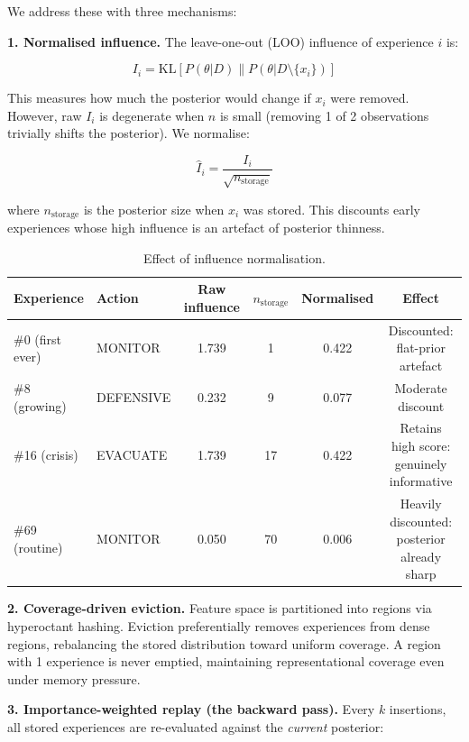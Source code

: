 \documentclass[11pt]{article}
\begin{document}
We address these with three mechanisms:

\textbf{1. Normalised influence.} The leave-one-out (LOO) influence of experience $i$ is:

\begin{equation}
I_i = \mathrm{KL}[P(\theta | D) \| P(\theta | D \setminus \{x_i\})]
\end{equation}

This measures how much the posterior would change if $x_i$ were removed. However, raw $I_i$ is degenerate when $n$ is small (removing 1 of 2 observations trivially shifts the posterior). We normalise:

\begin{equation}
\hat{I}_i = \frac{I_i}{\sqrt{n_{\text{storage}}}}
\end{equation}

\noindent where $n_{\text{storage}}$ is the posterior size when $x_i$ was stored. This discounts early experiences whose high influence is an artefact of posterior thinness.

\begin{table}[h]
\centering
\caption{Effect of influence normalisation.}
\label{tab:influence}
\small
\begin{tabular}{llcccc}
\toprule
\textbf{Experience} & \textbf{Action} & \textbf{Raw influence} & $n_{\text{storage}}$ & \textbf{Normalised} & \textbf{Effect} \\
\midrule
\#0 (first ever) & MONITOR & 1.739 & 1 & 0.422 & Discounted: flat-prior artefact \\
\#8 (growing) & DEFENSIVE & 0.232 & 9 & 0.077 & Moderate discount \\
\#16 (crisis) & EVACUATE & 1.739 & 17 & 0.422 & Retains high score: genuinely informative \\
\#69 (routine) & MONITOR & 0.050 & 70 & 0.006 & Heavily discounted: posterior already sharp \\
\bottomrule
\end{tabular}
\end{table}

\textbf{2. Coverage-driven eviction.} Feature space is partitioned into regions via hyperoctant hashing. Eviction preferentially removes experiences from dense regions, rebalancing the stored distribution toward uniform coverage. A region with 1 experience is never emptied, maintaining representational coverage even under memory pressure.

\textbf{3. Importance-weighted replay (the backward pass).} Every $k$ insertions, all stored experiences are re-evaluated against the \emph{current} posterior:
\end{document}
